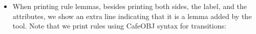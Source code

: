 \begin{itemize}
{\begin{comment}
  ceq printAddedRls(M, crl T => T' if C [AtS] . RS) =
                  ('\n '\t '\s '\s '\g 'ctrans QILL '\s '\o QIL1
                   '\n '\t '\s '\s '\s '\s '\g '=> '\s '\o QIL2
                   '\n '\t '\s '\s '\s '\s '\g 'if '\o '\s QIL3
                   '\s QIL4 '. '\b
                   ' '--> 'Transition 'added 'by 'the 'prover. '\o
                   printAddedRls(M, RS))
   if QIL1 := eMetaPrettyPrint(M, T) /\
      QIL2 := eMetaPrettyPrint(M, T') /\
      QIL3 := eMetaPrettyPrint(M, C) /\
      QIL4 := printCafeAtS(AtS) /\
      QILL := printLabel(AtS) .

  op printAddedEqLemmas : Module EquationSet -> QidList .
  eq printAddedEqLemmas(M, none) = nil .
  ceq printAddedEqLemmas(M, eq T = T' [AtS] . EqS) =
                  ('\n '\t '\s '\s '\g 'eq QILL '\s '\o QIL1
                   '\n '\t '\s '\s '\s '\s '\g '= '\s '\o QIL2
                   '\s QIL3 '. '\b
                   ' '--> 'Lemma 'added 'by 'the 'prover. '\o
                   printAddedEqLemmas(M, EqS))
   if QIL1 := eMetaPrettyPrint(M, T) /\
      QIL2 := eMetaPrettyPrint(M, T') /\
      QIL3 := printCafeAtS(AtS) /\
      QILL := printLabel(AtS) .
  ceq printAddedEqLemmas(M, ceq T = T' if C [AtS] . EqS) =
                  ('\n '\t '\s '\s '\g 'ceq QILL '\s '\o QIL1
                   '\n '\t '\s '\s '\s '\s '\g '= '\s '\o QIL2
                   '\n '\t '\s '\s '\s '\s '\g 'if '\o '\s QIL3
                   '\s QIL4 '. '\b
                   ' '--> 'Lemma 'added 'by 'the 'prover. '\o
                   printAddedEqLemmas(M, EqS))
   if QIL1 := eMetaPrettyPrint(M, T) /\
      QIL2 := eMetaPrettyPrint(M, T') /\
      QIL3 := eMetaPrettyPrint(M, C) /\
      QIL4 := printCafeAtS(AtS) /\
      QILL := printLabel(AtS) .
\end{comment}
}

\item
When printing rule lemmas, besides printing both sides, the label, and
the attributes, we show an extra line indicating that it is a lemma added
by the tool. Note that we print rules using CafeOBJ syntax for transitions:


\end{itemize}
